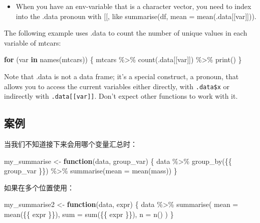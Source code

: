 \documentclass[
]{book}
\newenvironment{Shaded}{\begin{snugshade}}{\end{snugshade}}
\newcommand{\AttributeTok}[1]{\textcolor[rgb]{0.77,0.63,0.00}{#1}}
\newcommand{\ControlFlowTok}[1]{\textcolor[rgb]{0.13,0.29,0.53}{\textbf{#1}}}
\newcommand{\FunctionTok}[1]{\textcolor[rgb]{0.00,0.00,0.00}{#1}}
\newcommand{\NormalTok}[1]{#1}
\newcommand{\OtherTok}[1]{\textcolor[rgb]{0.56,0.35,0.01}{#1}}
\newcommand{\SpecialCharTok}[1]{\textcolor[rgb]{0.00,0.00,0.00}{#1}}
\providecommand{\tightlist}{%
  \setlength{\itemsep}{0pt}\setlength{\parskip}{0pt}}
\begin{document}
\begin{itemize}
\tightlist
\item
  When you have an env-variable that is a character vector, you need to index into the .data pronoun with {[}{[}, like summarise(df, mean = mean(.data{[}{[}var{]}{]})).
\end{itemize}

The following example uses .data to count the number of unique values in each variable of mtcars:

\begin{Shaded}
\begin{Highlighting}[]
\ControlFlowTok{for}\NormalTok{ (var }\ControlFlowTok{in} \FunctionTok{names}\NormalTok{(mtcars)) \{}
\NormalTok{  mtcars }\SpecialCharTok{\%\textgreater{}\%} \FunctionTok{count}\NormalTok{(.data[[var]]) }\SpecialCharTok{\%\textgreater{}\%} \FunctionTok{print}\NormalTok{()}
\NormalTok{\}}
\end{Highlighting}
\end{Shaded}

Note that .data is not a data frame; it's a special construct, a pronoun, that allows you to access the current variables either directly, with \texttt{.data\$x} or indirectly with \texttt{.data{[}{[}var{]}{]}}. Don't expect other functions to work with it.

\hypertarget{ux6848ux4f8b}{%
\subsection{案例}\label{ux6848ux4f8b}}

当我们不知道接下来会用哪个变量汇总时：

\begin{Shaded}
\begin{Highlighting}[]
\NormalTok{my\_summarise }\OtherTok{\textless{}{-}} \ControlFlowTok{function}\NormalTok{(data, group\_var) \{}
\NormalTok{  data }\SpecialCharTok{\%\textgreater{}\%}
    \FunctionTok{group\_by}\NormalTok{(\{\{ group\_var \}\}) }\SpecialCharTok{\%\textgreater{}\%}
    \FunctionTok{summarise}\NormalTok{(}\AttributeTok{mean =} \FunctionTok{mean}\NormalTok{(mass))}
\NormalTok{\}}
\end{Highlighting}
\end{Shaded}

如果在多个位置使用：

\begin{Shaded}
\begin{Highlighting}[]
\NormalTok{my\_summarise2 }\OtherTok{\textless{}{-}} \ControlFlowTok{function}\NormalTok{(data, expr) \{}
\NormalTok{  data }\SpecialCharTok{\%\textgreater{}\%} \FunctionTok{summarise}\NormalTok{(}
    \AttributeTok{mean =} \FunctionTok{mean}\NormalTok{(\{\{ expr \}\}),}
    \AttributeTok{sum =} \FunctionTok{sum}\NormalTok{(\{\{ expr \}\}),}
    \AttributeTok{n =} \FunctionTok{n}\NormalTok{()}
\NormalTok{  )}
\NormalTok{\}}
\end{Highlighting}
\end{Shaded}
\end{document}
